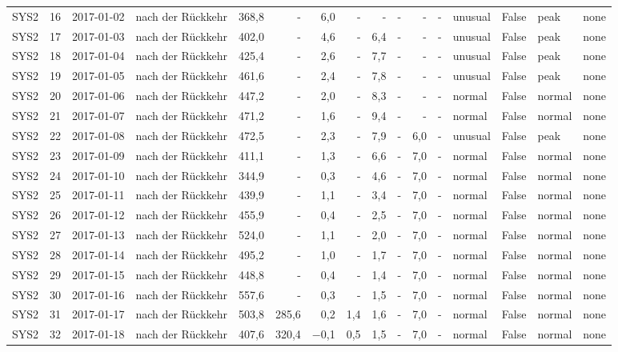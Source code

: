 \begin{tabular}{lrllrrrrrrrrlrll}
SYS2 & 16 & 2017-01-02 & nach der Rückkehr & 368,8 & - & 6,0 & - & - & - & - & - & unusual & False & peak & none \\
SYS2 & 17 & 2017-01-03 & nach der Rückkehr & 402,0 & - & 4,6 & - & 6,4 & - & - & - & unusual & False & peak & none \\
SYS2 & 18 & 2017-01-04 & nach der Rückkehr & 425,4 & - & 2,6 & - & 7,7 & - & - & - & unusual & False & peak & none \\
SYS2 & 19 & 2017-01-05 & nach der Rückkehr & 461,6 & - & 2,4 & - & 7,8 & - & - & - & unusual & False & peak & none \\
SYS2 & 20 & 2017-01-06 & nach der Rückkehr & 447,2 & - & 2,0 & - & 8,3 & - & - & - & normal & False & normal & none \\
SYS2 & 21 & 2017-01-07 & nach der Rückkehr & 471,2 & - & 1,6 & - & 9,4 & - & - & - & normal & False & normal & none \\
SYS2 & 22 & 2017-01-08 & nach der Rückkehr & 472,5 & - & 2,3 & - & 7,9 & - & 6,0 & - & unusual & False & peak & none \\
SYS2 & 23 & 2017-01-09 & nach der Rückkehr & 411,1 & - & 1,3 & - & 6,6 & - & 7,0 & - & normal & False & normal & none \\
SYS2 & 24 & 2017-01-10 & nach der Rückkehr & 344,9 & - & 0,3 & - & 4,6 & - & 7,0 & - & normal & False & normal & none \\
SYS2 & 25 & 2017-01-11 & nach der Rückkehr & 439,9 & - & 1,1 & - & 3,4 & - & 7,0 & - & normal & False & normal & none \\
SYS2 & 26 & 2017-01-12 & nach der Rückkehr & 455,9 & - & 0,4 & - & 2,5 & - & 7,0 & - & normal & False & normal & none \\
SYS2 & 27 & 2017-01-13 & nach der Rückkehr & 524,0 & - & 1,1 & - & 2,0 & - & 7,0 & - & normal & False & normal & none \\
SYS2 & 28 & 2017-01-14 & nach der Rückkehr & 495,2 & - & 1,0 & - & 1,7 & - & 7,0 & - & normal & False & normal & none \\
SYS2 & 29 & 2017-01-15 & nach der Rückkehr & 448,8 & - & 0,4 & - & 1,4 & - & 7,0 & - & normal & False & normal & none \\
SYS2 & 30 & 2017-01-16 & nach der Rückkehr & 557,6 & - & 0,3 & - & 1,5 & - & 7,0 & - & normal & False & normal & none \\
SYS2 & 31 & 2017-01-17 & nach der Rückkehr & 503,8 & 285,6 & 0,2 & 1,4 & 1,6 & - & 7,0 & - & normal & False & normal & none \\
SYS2 & 32 & 2017-01-18 & nach der Rückkehr & 407,6 & 320,4 & $-$0,1 & 0,5 & 1,5 & - & 7,0 & - & normal & False & normal & none \\

\end{tabular}
